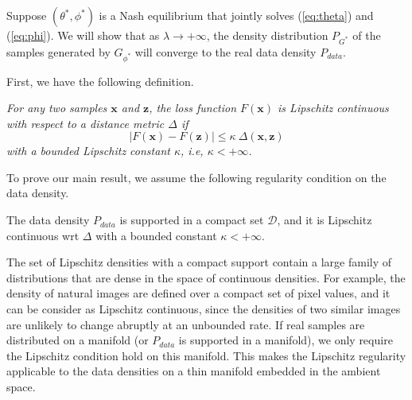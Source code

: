 Suppose $(\theta^*,\phi^*)$ is a Nash equilibrium that jointly solves  (\ref{eq:theta}) and (\ref{eq:phi}).  We will show that as $\lambda\rightarrow +\infty$, the density distribution $P_{G^*}$ of the samples generated by $G_{\phi^*}$ will converge to the real data density $P_{data}$.


First, we have the following definition.

{ \em For any two samples $\mathbf x$ and $\mathbf z$, the loss function $F(\mathbf x)$ is Lipschitz continuous with respect to a distance metric $\Delta$ if
$$
|F(\mathbf x) - F(\mathbf z)|\leq \kappa ~ \Delta(\mathbf x, \mathbf z)
$$
with a bounded Lipschitz constant $\kappa$, i.e, $\kappa<+\infty$.
}


To prove our main result, we assume the following regularity condition on the data density. %
\begin{assumption}\label{asp}
The data density $P_{data}$ is supported in a compact set $\mathcal D$, and it is Lipschitz continuous wrt $\Delta$ with a bounded constant $\kappa<+\infty$.
\end{assumption}



The set of Lipschitz densities with a compact support contain a large family of distributions that are dense in the space of continuous densities.
For example, the density of natural images are defined over a compact set of pixel values, and it can be consider as Lipschitz continuous, since the densities of two similar images are unlikely to change abruptly at an unbounded rate. If real samples are distributed on a manifold (or $P_{data}$ is supported in a manifold), we only require the Lipschitz condition hold on this manifold.  This makes the Lipschitz regularity applicable to the data densities on a thin manifold embedded in the ambient space.


